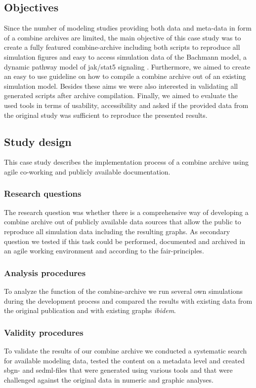 \subsection*{Objectives}
Since the number of modeling studies providing both data and meta-data in form of a \ac{combine} archives are limited, the main objective of this case study was to create a fully featured \acs{combine}-archive including both scripts to reproduce all simulation figures and easy to access simulation data of the Bachmann model, a dynamic pathway model of \ac{jak}/\ac{stat}5 signaling \cite{bachmannmodel}. Furthermore, we aimed to create an easy to use guideline on how to compile a \acs{combine} archive out of an existing simulation model. Besides these aims we were also interested in validating all generated scripts after archive compilation. Finally, we aimed to evaluate the used tools in terms of usability, accessibility and asked if the provided data from the original study was sufficient to reproduce the presented results.

\subsection*{Study design}
This case study describes the implementation process of a \ac{combine} archive using agile co-working and publicly available documentation.
\subsubsection*{Research questions}
The research question was whether there is a comprehensive way of developing a \ac{combine} archive out of publicly available data sources that allow the public to reproduce all simulation data including the resulting graphs. As secondary question we tested if this task could be performed, documented and archived in an agile working environment and according to the \acs{fair}-principles.
\subsubsection*{Analysis procedures}
To analyze the function of the \ac{combine}-archive we run several own simulations during the development process and compared the results with existing data from the original publication and with existing graphs \textit{ibidem}.
\subsubsection*{Validity procedures}
To validate the results of our \ac{combine} archive we conducted a systematic search for available modeling data, tested the content on a metadata level and created \ac{sbgn}- and \ac{sedml}-files that were generated using various tools and that were challenged against the original data in numeric and graphic analyses.
